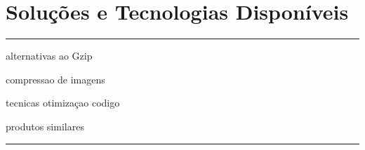 \section{Soluções e Tecnologias Disponíveis} \label{solucoesDisponiveis}

{\color{red} \rule{\linewidth}{0.5mm} } 
alternativas ao Gzip
\par
compressao de imagens
\par
tecnicas otimizaçao codigo
\par
produtos similares
\par
{\color{red} \rule{\linewidth}{0.5mm} } 








